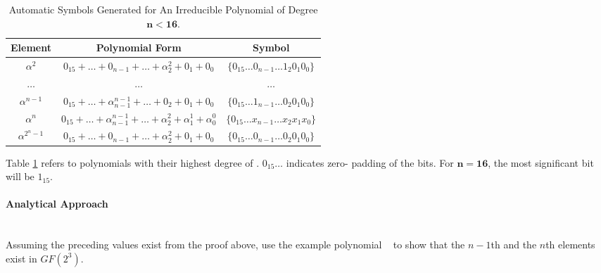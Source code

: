    \begin{table}[h]
        \def\arraystretch{2.5}
        \caption{Automatic Symbols Generated for An Irreducible Polynomial of
        Degree $\bm{n < 16}$.}
        \centering
        \begin{tabular*}{400pt}{@{\extracolsep{\fill}} ccc}

        \textbf{Element} & \textbf{Polynomial Form} & \textbf{Symbol}
        \\
        \hline

        $\alpha^{2}$ & $0_{15} + \ldots + 0_{n-1} + \ldots +
        \alpha^{2}_{2} + 0_{1} + 0_{0}$ & $\{ 0_{15} \ldots 0_{n-1}
        \ldots 1_{2} 0_{1} 0_{0} \}$ \\

        $\ldots$ & $\ldots$ & $\ldots$ \\

        $\alpha^{n-1}$ & $0_{15} + \ldots + \alpha^{n-1}_{n-1} + \ldots
        + 0_{2} + 0_{1} + 0_{0}$ & $\{ 0_{15} \ldots 1_{n-1} \ldots 0_{2} 0_{1}
          0_{0} \}$ \\

        $\alpha^{n}$ & $0_{15} + \ldots + \alpha^{n-1}_{n-1} + \ldots
        +\alpha^{2}_{2} + \alpha^{1}_{1} + \alpha^{0}_{0}$ & $\{ 0_{15}
        \ldots x_{n-1} \ldots x_{2} x_{1} x_{0} \}$ \\

        $\alpha^{2^{n}-1}$ & $0_{15} + \ldots + 0_{n-1} + \ldots +
        \alpha^{2}_{2} + 0_{1} + 0_{0}$ & $\{ 0_{15} \ldots 0_{n-1}
        \ldots 0_{2} 0_{1} 0_{0} \}$ \\

        \end{tabular*}
        \label{table:auto_sym}
    \end{table}

    Table \ref{table:auto_sym} refers to polynomials with their highest degree
    of . $0_{15}\ldots$ indicates zero- padding of the bits. For
    $\bm{n = 16}$, the most significant bit will be $1_{15}$.

        \paragraph{Analytical Approach} \leavevmode \\ Assuming the preceding
        values exist from the proof above, use the example polynomial
        \examplepoly~ to show that the $n-1$th and the $n$th elements exist in
        $GF(2^{3})$.

